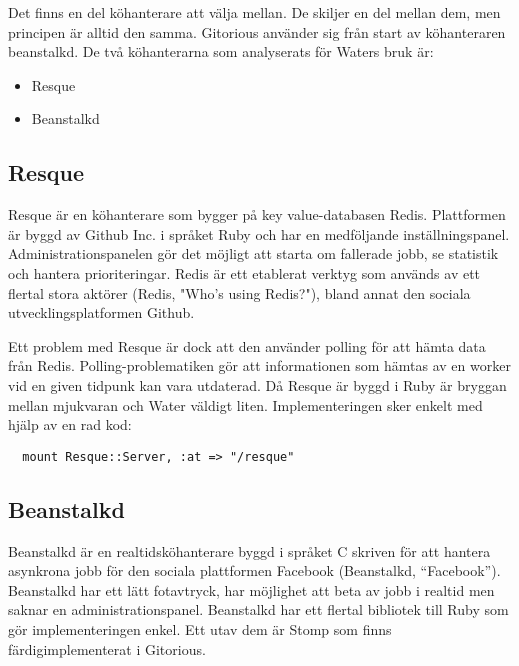 Det finns en del köhanterare att välja mellan. De skiljer en del mellan dem, men principen är alltid den samma. Gitorious använder sig från start av köhanteraren beanstalkd.
De två köhanterarna som analyserats för Waters bruk är:

\begin{itemize}
  \item Resque
  \item Beanstalkd
\end{itemize}

\subsection{Resque}

Resque är en köhanterare som bygger på key value-databasen Redis. Plattformen är byggd av Github Inc. i språket Ruby och har en medföljande inställningspanel. Administrationspanelen gör det möjligt att starta om fallerade jobb, se statistik och hantera prioriteringar. Redis är ett etablerat verktyg som används av ett flertal stora aktörer (Redis, "Who's using Redis?"), bland annat den sociala utvecklingsplatformen Github.

Ett problem med Resque är dock att den använder polling för att hämta data från Redis. Polling-problematiken gör att informationen som hämtas av en worker vid en given tidpunk kan vara utdaterad. Då Resque är byggd i Ruby är bryggan mellan mjukvaran och Water väldigt liten. Implementeringen sker enkelt med hjälp av en rad kod:

\begin{verbatim}
  mount Resque::Server, :at => "/resque"
\end{verbatim}

\subsection{Beanstalkd}
Beanstalkd är en realtidsköhanterare byggd i språket C skriven för att hantera asynkrona jobb för den sociala plattformen Facebook (Beanstalkd, “Facebook”). Beanstalkd har ett lätt fotavtryck, har möjlighet att beta av jobb i realtid men saknar en administrationspanel.
Beanstalkd har ett flertal bibliotek till Ruby som gör implementeringen enkel. Ett utav dem är Stomp som finns färdigimplementerat i Gitorious.
